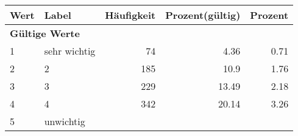      \begin{longtable}{lXrrr}
     \toprule
     \textbf{Wert} & \textbf{Label} & \textbf{Häufigkeit} & \textbf{Prozent(gültig)} & \textbf{Prozent} \\
     \endhead
     \midrule
     \multicolumn{5}{l}{\textbf{Gültige Werte}}\\

     1 &
     \multicolumn{1}{X}{ sehr wichtig   } &


       \num{74} &
       \num[round-mode=places,round-precision=2]{4.36} &
         \num[round-mode=places,round-precision=2]{0.71} \\

     2 &
     \multicolumn{1}{X}{ 2   } &


       \num{185} &
       \num[round-mode=places,round-precision=2]{10.9} &
         \num[round-mode=places,round-precision=2]{1.76} \\

     3 &
     \multicolumn{1}{X}{ 3   } &


       \num{229} &
       \num[round-mode=places,round-precision=2]{13.49} &
         \num[round-mode=places,round-precision=2]{2.18} \\

     4 &
     \multicolumn{1}{X}{ 4   } &


       \num{342} &
       \num[round-mode=places,round-precision=2]{20.14} &
         \num[round-mode=places,round-precision=2]{3.26} \\

     5 &
     \multicolumn{1}{X}{ unwichtig   } &



\end{longtable}
